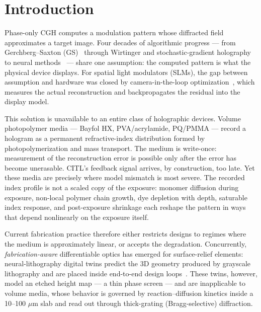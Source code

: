 \documentclass[conference]{IEEEtran}
\begin{document}
\section{Introduction}
Phase-only CGH computes a modulation pattern whose diffracted field
approximates a target image. Four decades of algorithmic progress — from
Gerchberg--Saxton (GS)~\cite{gerchberg1972practical} through Wirtinger and
stochastic-gradient holography~\cite{chakravarthula2019wirtinger} to neural
methods~\cite{peng2020neural,shi2021towards} — share one assumption: the
computed pattern is what the physical device displays. For spatial light
modulators (SLMs), the gap between assumption and hardware was closed by
camera-in-the-loop optimization~\cite{peng2020neural}, which measures the
actual reconstruction and backpropagates the residual into the display model.

This solution is unavailable to an entire class of holographic devices.
Volume photopolymer media — Bayfol HX, PVA/acrylamide, PQ/PMMA — record a
hologram as a permanent refractive-index distribution formed by
photopolymerization and mass transport. The medium is write-once: measurement
of the reconstruction error is possible only after the error has become
unerasable. CITL's feedback signal arrives, by construction, too late. Yet
these media are precisely where model mismatch is most severe. The recorded
index profile is not a scaled copy of the exposure: monomer diffusion during
exposure, non-local polymer chain growth, dye depletion with depth, saturable
index response, and post-exposure shrinkage each reshape the pattern in ways
that depend nonlinearly on the exposure itself.

Current fabrication practice therefore either restricts designs to regimes
where the medium is approximately linear, or accepts the degradation.
Concurrently, \emph{fabrication-aware} differentiable optics has emerged for
surface-relief elements: neural-lithography digital twins predict the 3D
geometry produced by grayscale lithography and are placed inside end-to-end
design loops~\cite{zheng2023neural}. These twins, however, model an etched
height map — a thin phase screen — and are inapplicable to volume media, whose
behavior is governed by reaction--diffusion kinetics inside a 10--100 $\mu$m
slab and read out through thick-grating (Bragg-selective) diffraction.
\end{document}
